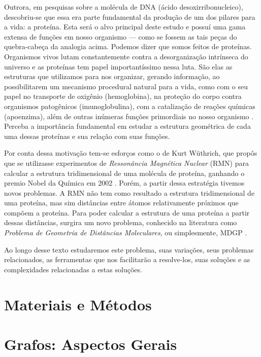 \documentclass[a4paper,12pt]{article}
\begin{document}
	Outrora, em pesquisas sobre a molécula de DNA (ácido desoxirribonucleico), descobriu-se que essa era parte fundamental da produção de um dos pilares para a vida: a proteína. Esta será o alvo principal deste estudo e possuí uma gama extensa de funções em nosso organismo --- como se fossem as tais peças do quebra-cabeça da analogia acima. Podemos dizer que somos feitos de proteínas. Organismos vivos lutam constantemente contra a desorganização intrínseca do universo e as proteínas tem papel importantíssimo nessa luta. São elas as estruturas que utilizamos para nos organizar, gerando informação, ao possibilitarem um mecanismo procedural natural para a vida, como com o seu papel no transporte de oxigênio (hemoglobina), na proteção do corpo contra organismos patogênicos (imunoglobulina), com a catalização de reações químicas (apoenzima), além de outras inúmeras funções primordiais no nosso organismo \cite{fidalgotese}. Perceba a importância fundamental em estudar a estrutura geométrica de cada uma dessas proteínas e sua relação com suas funções.
	
	Por conta dessa motivação tem-se esforços como o de Kurt Wüthrich, que propôs que se utilizasse experimentos de \textit{Ressonância Magnética Nuclear}
	(RMN) para calcular a estrutura tridimensional de uma molécula de proteína, ganhando o premio Nobel da Química em 2002 \cite{RMNproteinWrutrich}. Porém, a partir dessa estratégia tivemos novos problemas. A RMN não tem como resultado a estrutura tridimensional de uma proteína, mas sim distâncias entre átomos relativamente próximos que compõem a proteína. Para poder calcular a estrutura de uma proteína a partir dessas distâncias, surgira um novo problema, conhecido na literatura como \textit{Problema de Geometria de Distâncias Moleculares}, ou simplesmente, MDGP \cite{carlileGDandAplications}.
	
	Ao longo desse texto estudaremos este problema, suas variações, seus problemas relacionados, as ferramentas que nos facilitarão a resolve-los, suas soluções e as complexidades relacionadas a estas soluções.
	
	\newpage

	\section{Materiais e Métodos}
	
	\newpage
	
	\section{Grafos: Aspectos Gerais}
	
\end{document}
